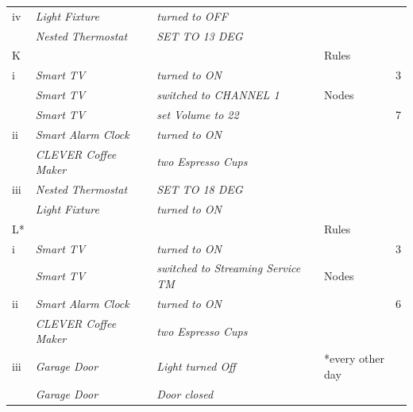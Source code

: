 \begin{table}[]
{\begin{tabular}{llll}
iv            & \textit{Light Fixture}        & \textit{turned to OFF}                    &                           \\
              & \textit{Nested Thermostat}    & \textit{SET TO 13 DEG}                    &                           \\ \hline
K             & \textit{}                     & \textit{}                                 & Rules                     \\
i             & \textit{Smart TV}             & \textit{turned to ON}                     & \multicolumn{1}{r}{3}     \\
              & \textit{Smart TV}             & \textit{switched to CHANNEL 1}            & Nodes                     \\
              & \textit{Smart TV}             & \textit{set Volume to 22}                 & \multicolumn{1}{r}{7}     \\
ii            & \textit{Smart Alarm Clock}    & \textit{turned to ON}                     &                           \\
              & \textit{CLEVER Coffee Maker}  & \textit{two Espresso Cups}                &                           \\
iii           & \textit{Nested Thermostat}    & \textit{SET TO 18 DEG}                    &                           \\
              & \textit{Light Fixture}        & \textit{turned to ON}                     &                           \\ \hline
L*            & \textit{}                     & \textit{}                                 & Rules                     \\
i             & \textit{Smart TV}             & \textit{turned to ON}                     & \multicolumn{1}{r}{3}     \\
              & \textit{Smart TV}             & \textit{switched to Streaming Service TM} & Nodes                     \\
ii            & \textit{Smart Alarm Clock}    & \textit{turned to ON}                     & \multicolumn{1}{r}{6}     \\
              & \textit{CLEVER Coffee Maker}  & \textit{two Espresso Cups}                &                           \\
iii           & \textit{Garage Door}          & \textit{Light turned Off}                 & *every other day          \\
              & \textit{Garage Door}          & \textit{Door closed}                      &                           \\ \hline

\end{tabular}}
\end{table}
